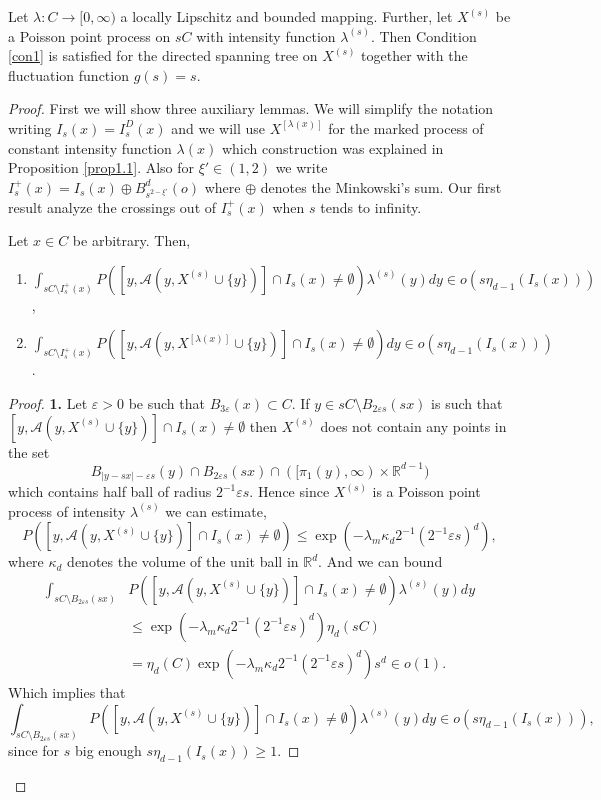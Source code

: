 \begin{prop} Let $\lambda: C\rightarrow [0,\infty)$ a locally Lipschitz  and bounded mapping. Further, let $X^{(s)}$ be a Poisson point process on $sC$ with intensity function $\lambda^{(s)}$. Then Condition \ref{con1} is satisfied for the directed spanning tree on $X^{(s)}$ together with the fluctuation function $g(s)=s$.
\end{prop}
\begin{proof}
First we will show three auxiliary lemmas. We will simplify the notation writing $I_s(x)=I^D_s(x)$ and we will use $X^{[\lambda(x)]}$ for the marked process of constant intensity function $\lambda(x)$ which construction was explained in Proposition \ref{prop1.1}. Also for $\xi'\in(1,2)$ we write $I^+_s(x)=I_s(x)\oplus B^d_{s^{2-\xi'}}(o) $ where $\oplus$ denotes the Minkowski's sum. Our first result analyze the crossings out of $I^+_s(x)$ when $s$ tends to infinity.
\begin{lem}\label{lem2.3} Let $x\in C$ be arbitrary. Then,
\begin{enumerate}
\item $\int_{sC\setminus I^+_s(x)}P([y, \mathcal{A}(y,X^{(s)}\cup\lbrace y\rbrace)]\cap I_s(x)\neq \emptyset)\lambda^{(s)}(y)dy\in o(s\eta_{d-1}(I_s(x)))$,
\item $\int_{sC\setminus I^+_s(x)}P([y, \mathcal{A}(y,X^{[\lambda(x)]}\cup\lbrace y\rbrace)]\cap I_s(x)\neq \emptyset)dy\in o(s\eta_{d-1}(I_s(x)))$.

\end{enumerate}

\end{lem}
\begin{proof}
\textbf{1.} Let $\varepsilon>0$ be such that $B_{3\varepsilon}(x)\subset C$. If $y\in sC\setminus B_{2\varepsilon s}(sx)$ is such that $[y, \mathcal{A}(y,X^{(s)}\cup\lbrace y\rbrace)]\cap I_s(x)\neq \emptyset$ then $X^{(s)}$ does not contain any points in the set 
$$B_{\vert y-sx\vert -\varepsilon s}(y)\cap B_{2\varepsilon s}(sx)\cap ([\pi_1 (y), \infty)\times\mathbb{R}^{d-1})$$
which contains half ball of radius $2^{-1}\varepsilon s.$  Hence since $X^{(s)}$ is a Poisson point process of intensity $\lambda^{(s)}$ we can estimate,
$$P([y, \mathcal{A}(y,X^{(s)}\cup\lbrace y\rbrace)]\cap I_s(x)\neq \emptyset)\leq \exp(-\lambda_m\kappa_d 2^{-1}(2^{-1}\varepsilon s)^d), $$ where $\kappa_d$ denotes the volume of the unit ball in $\mathbb{R}^d$. And we can bound
\begin{align}
\int_{sC\setminus B_{2\varepsilon s}(sx)}&P([y, \mathcal{A}(y,X^{(s)}\cup\lbrace y\rbrace)]\cap I_s(x)\neq \emptyset)\lambda^{(s)}(y)dy\nonumber\\
&\leq\exp(-\lambda_m\kappa_d 2^{-1}(2^{-1}\varepsilon s)^d)\eta_{d}(sC)\nonumber\\
&=\eta_{d}(C)\exp(-\lambda_m\kappa_d 2^{-1}(2^{-1}\varepsilon s)^d)s^{d}\in o(1).\nonumber
\end{align}
Which implies that $$\int_{sC\setminus B_{2\varepsilon s}(sx)}P([y, \mathcal{A}(y,X^{(s)}\cup\lbrace y\rbrace)]\cap I_s(x)\neq \emptyset)\lambda^{(s)}(y)dy\in o(s\eta_{d-1}(I_s(x))),$$ since for $s$ big enough $s\eta_{d-1}(I_s(x))\geq 1$.


\end{proof}
\end{proof}
